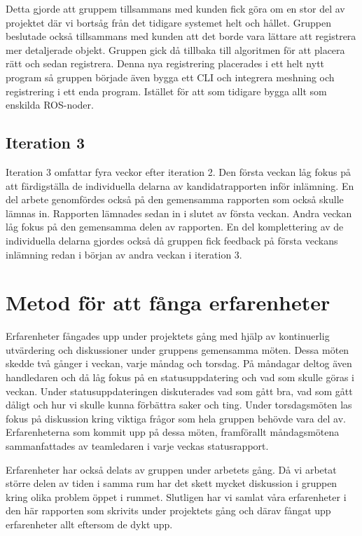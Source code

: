 Detta gjorde att gruppem tillsammans med kunden fick göra om en stor del av projektet där vi bortsåg från det tidigare systemet helt och hållet. Gruppen beslutade också tillsammans med kunden att det borde vara lättare att registrera mer detaljerade objekt. Gruppen gick då tillbaka till algoritmen för att placera rätt och sedan registrera. Denna nya registrering placerades i ett helt nytt program så gruppen började även bygga ett CLI och integrera meshning och registrering i ett enda program. Istället för att som tidigare bygga allt som enskilda ROS-noder.

\subsection{Iteration 3}

Iteration 3 omfattar fyra veckor efter iteration 2. Den första veckan låg fokus på att färdigställa de individuella delarna av kandidatrapporten inför inlämning. En del arbete genomfördes också på den gemensamma rapporten som också skulle lämnas in. Rapporten lämnades sedan in i slutet av första veckan. Andra veckan låg fokus på den gemensamma delen av rapporten. En del komplettering av de individuella delarna gjordes också då gruppen fick feedback på första veckans inlämning redan i början av andra veckan i iteration 3.


\section{Metod för att fånga erfarenheter}

Erfarenheter fångades upp under projektets gång med hjälp av kontinuerlig utvärdering och diskussioner under gruppens gemensamma möten. Dessa möten skedde två gånger i veckan, varje måndag och torsdag. På måndagar deltog även handledaren och då låg fokus på en statusuppdatering och vad som skulle göras i veckan. Under statusuppdateringen diskuterades vad som gått bra, vad som gått dåligt och hur vi skulle kunna förbättra saker och ting. Under torsdagsmöten las fokus på diskussion kring viktiga frågor som hela gruppen behövde vara del av. Erfarenheterna som kommit upp på dessa möten, framförallt måndagsmötena sammanfattades av teamledaren i varje veckas statusrapport.

Erfarenheter har också delats av gruppen under arbetets gång. Då vi arbetat större delen av tiden i samma rum har det skett mycket diskussion i gruppen kring olika problem öppet i rummet. Slutligen har vi samlat våra erfarenheter i den här rapporten som skrivits under projektets gång och därav fångat upp erfarenheter allt eftersom de dykt upp.


